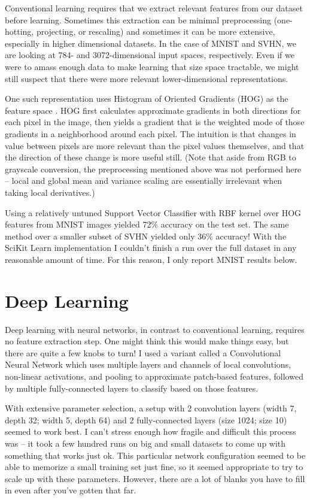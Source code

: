 \documentclass{article}
\begin{document}
Conventional learning requires that we extract relevant features from our dataset before learning. Sometimes this extraction can be minimal preprocessing (one-hotting, projecting, or rescaling) and sometimes it can be more extensive, especially in higher dimensional datasets. In the case of MNIST and SVHN, we are looking at 784- and 3072-dimensional input spaces, respectively. Even if we were to amass enough data to make learning that size space tractable, we might still suspect that there were more relevant lower-dimensional representations.

One such representation uses Histogram of Oriented Gradients (HOG) as the feature space \cite{netzer2011reading}.  HOG first calculates approximate gradients in both directions for each pixel in the image, then yields a gradient that is the weighted mode of those gradients in a neighborhood around each pixel. The intuition is that changes in value between pixels are more relevant than the pixel values themselves, and that the direction of these change is more useful still.  (Note that aside from RGB to grayscale conversion, the preprocessing mentioned above was not performed here -- local and global mean and variance scaling are essentially irrelevant when taking local derivatives.)

Using a relatively untuned Support Vector Classifier with RBF kernel over HOG features from MNIST images yielded 72\% accuracy on the test set. The same method over a smaller subset of SVHN yielded only 36\% accuracy! With the SciKit Learn implementation I couldn't finish a run over the full dataset in any reasonable amount of time. For this reason, I only report MNIST results below.

\section{Deep Learning}

Deep learning with neural networks, in contrast to conventional learning, requires no feature extraction step. One might think this would make things easy, but there are quite a few knobs to turn! I used a variant called a Convolutional Neural Network which uses multiple layers and channels of local convolutions, non-linear activations, and pooling to approximate patch-based features, followed by multiple fully-connected layers to classify based on those features.

With extensive parameter selection, a setup with 2 convolution layers (width 7, depth 32; width 5, depth 64) and 2 fully-connected layers (size 1024; size 10) seemed to work best. I can't stress enough how fragile and difficult this process was -- it took a few hundred runs on big and small datasets to come up with something that works just ok. This particular network configuration seemed to be able to memorize a small training set just fine, so it seemed appropriate to try to scale up with these parameters. However, there are a lot of blanks you have to fill in even after you've gotten that far.
\end{document}
